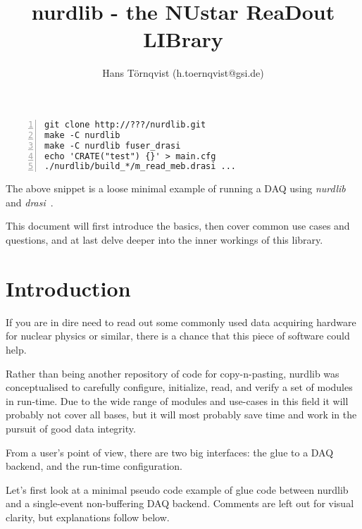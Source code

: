 \documentclass{article}
\author{Hans T\"ornqvist (h.toernqvist@gsi.de)}
\title{nurdlib - the NUstar ReaDout LIBrary}
\begin{document}
\maketitle




\begin{Verbatim}[frame=single,numbers=left]
git clone http://???/nurdlib.git
make -C nurdlib
make -C nurdlib fuser_drasi
echo 'CRATE("test") {}' > main.cfg
./nurdlib/build_*/m_read_meb.drasi ...
\end{Verbatim}

The above snippet is a loose minimal example of running a DAQ using
\emph{nurdlib} and \emph{drasi}~\cite{bib:drasi}.

This document will first introduce the basics, then cover common use cases and
questions, and at last delve deeper into the inner workings of this library.



\section{Introduction}

If you are in dire need to read out some commonly used data acquiring hardware
for nuclear physics or similar, there is a chance that this piece of software
could help.

Rather than being another repository of code for copy-n-pasting, nurdlib was
conceptualised to carefully configure, initialize, read, and verify a set of
modules in run-time. Due to the wide range of modules and use-cases in this
field it will probably not cover all bases, but it will most probably save
time and work in the pursuit of good data integrity.

From a user's point of view, there are two big interfaces: the glue to a DAQ
backend, and the run-time configuration.

Let's first look at a minimal pseudo code example of glue code between nurdlib
and a single-event non-buffering DAQ backend. Comments are left out for visual
clarity, but explanations follow below.
\end{document}
